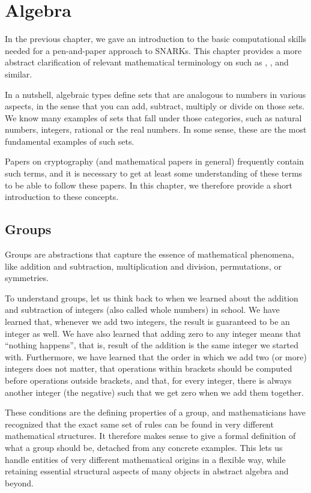 \chapter{Algebra}

In the previous chapter, we gave an introduction to the basic computational skills needed for a pen-and-paper approach to SNARKs. This chapter provides a more abstract clarification of  relevant mathematical terminology on  such as , ,  and similar.

In a nutshell, algebraic types define sets that are analogous to numbers in various aspects, in the sense that you can add, subtract, multiply or divide on those sets.
We know many examples of sets that fall under those categories, such as natural numbers, integers,  rational or the real numbers. In some sense, these are the most fundamental examples of such sets.

Papers on cryptography (and mathematical papers in general) frequently contain such terms, and it is necessary to get at least some understanding of these terms to be able to follow these papers.
In this chapter, we therefore provide a short introduction to these concepts.

\section{Groups}\label{sec:groups}
 Groups are abstractions that capture the essence of mathematical phenomena, like addition and subtraction, multiplication and division, permutations, or symmetries.

To understand groups, let us think back to when we learned about the addition and subtraction of integers (also called whole numbers) in school. We have learned that, whenever we add two integers, the result is guaranteed to be an integer as well. We have also learned that adding zero to any integer means that ``nothing happens'', that is, result of the addition is the same integer we started with. Furthermore, we have learned that the order in which we add two (or more) integers does not matter, that operations within brackets should be computed before operations outside brackets, and that, for every integer, there is always another integer (the negative) such that we get zero when we add them together.

These conditions are the defining properties of a group, and mathematicians have recognized that the exact same set of rules can be found in very different mathematical structures. It therefore makes sense to give a formal definition of what a group should be, detached from any concrete examples. This lets us handle entities of very different mathematical origins in a flexible way, while retaining essential structural aspects of many objects in abstract algebra and beyond.


